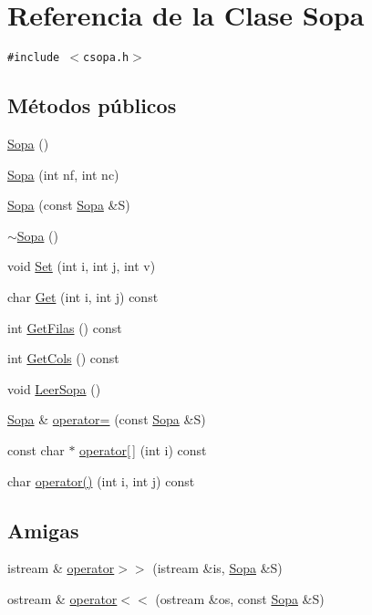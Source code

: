 \hypertarget{class_sopa}{
\section{Referencia de la Clase Sopa}
\label{class_sopa}
}
{\tt \#include $<$csopa.h$>$}

\subsection*{Métodos públicos}
\begin{CompactItemize}
\item 
\hyperlink{class_sopa_3fd197061417a2d3ed4c8d241fcc0e6d}{Sopa} ()
\item 
\hyperlink{class_sopa_10cb615d72a5611d8b8ebecb91305983}{Sopa} (int nf, int nc)
\item 
\hyperlink{class_sopa_7acac0d05edf78fad798d56006bf9909}{Sopa} (const \hyperlink{class_sopa}{Sopa} \&S)
\item 
\hyperlink{class_sopa_6773f50bfea79450b22629d7dac123a8}{$\sim$Sopa} ()
\item 
void \hyperlink{class_sopa_47815b3d8dda011e75749387b43bfa92}{Set} (int i, int j, int v)
\item 
char \hyperlink{class_sopa_03af8acd61e5b23acdf1f010fb36845c}{Get} (int i, int j) const 
\item 
int \hyperlink{class_sopa_97a63c30e5c03a6870e1459cf0a760be}{GetFilas} () const 
\item 
int \hyperlink{class_sopa_614d4b57feb5bf092e86471270f3be4d}{GetCols} () const 
\item 
void \hyperlink{class_sopa_d313e5e948a60d99f232024842cae8ef}{LeerSopa} ()
\item 
\hyperlink{class_sopa}{Sopa} \& \hyperlink{class_sopa_3f472f3e6179df645c12ba3f7c883cb8}{operator=} (const \hyperlink{class_sopa}{Sopa} \&S)
\item 
const char $\ast$ \hyperlink{class_sopa_9b09ad8b8f618a7a21d93c074aba4b07}{operator\mbox{[}$\,$\mbox{]}} (int i) const 
\item 
char \hyperlink{class_sopa_c58e6733cdd53d94097731f467cc183a}{operator()} (int i, int j) const 
\end{CompactItemize}
\subsection*{Amigas}
\begin{CompactItemize}
\item 
istream \& \hyperlink{class_sopa_18c0ca8c237f9bf2c95d59ba29c3cba4}{operator$>$$>$} (istream \&is, \hyperlink{class_sopa}{Sopa} \&S)
\item 
ostream \& \hyperlink{class_sopa_b487f8c25d6a206ddd694026397c2b5c}{operator$<$$<$} (ostream \&os, const \hyperlink{class_sopa}{Sopa} \&S)
\end{CompactItemize}


